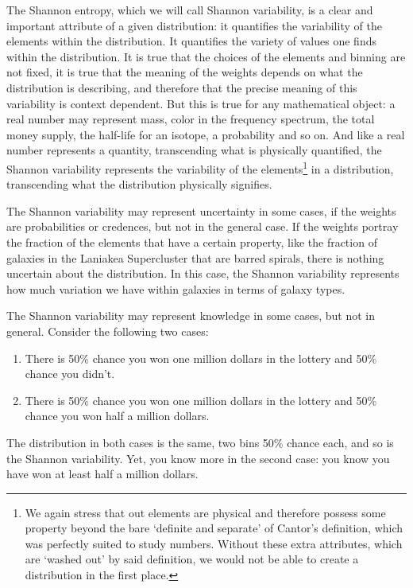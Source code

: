 \documentclass{article}
\begin{document}
The Shannon entropy, which we will call Shannon variability, is a clear and important attribute of a given distribution: it quantifies the variability of the elements within the distribution. It quantifies the variety of values one finds within the distribution. It is true that the choices of the elements and binning are not fixed, it is true that the meaning of the weights depends on what the distribution is describing, and therefore that the precise meaning of this variability is context dependent. But this is true for any mathematical object: a real number may represent mass, color in the frequency spectrum, the total money supply, the half-life for an isotope, a probability and so on. And like a real number represents a quantity, transcending what is physically quantified, the Shannon variability represents the variability of the elements\footnote{We again stress that out elements are physical and therefore possess some property beyond the bare `definite and separate' of Cantor's definition, which was perfectly suited to study numbers. Without these extra attributes, which are `washed out' by said definition, we would not be able to create a distribution in the first place.} in a distribution, transcending what the distribution physically signifies.

The Shannon variability may represent uncertainty in some cases, if the weights are probabilities or credences, but not in the general case. If the weights portray the fraction of the elements that have a certain property, like the fraction of galaxies in the Laniakea Supercluster that are barred spirals, there is nothing uncertain about the distribution. In this case, the Shannon variability represents how much variation we have within galaxies in terms of galaxy types.

The Shannon variability may represent knowledge in some cases, but not in general. Consider the following two cases:
\begin{enumerate}
\item There is 50\% chance you won one million dollars in the lottery and 50\% chance you didn't.
\item There is 50\% chance you won one million dollars in the lottery and 50\% chance you won half a million dollars.
\end{enumerate}
The distribution in both cases is the same, two bins 50\% chance each, and so is the Shannon variability. Yet, you know more in the second case: you know you have won at least half a million dollars.
\end{document}

